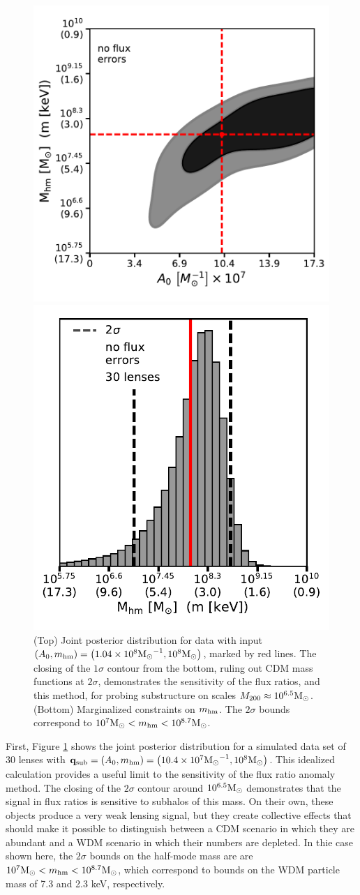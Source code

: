 \begin{figure}
	\centerline{
		\includegraphics[clip,trim=0cm .5cm 0cm
		0cm,width=.48\textwidth,keepaspectratio]{./figures_ABCforward/joint_30_0025_8_noerrors.pdf}
	}
	\centerline{
		\includegraphics[clip,trim=0cm 0cm 0cm
		0cm,width=.48\textwidth,keepaspectratio]{./figures_ABCforward/marginal_mhm_30lens_0025_8.pdf}
	}
	\caption[Posterior distribution for the half-mode mass inferred from WDM mock datasets]{\label{fig:wdm_inf_noerror}
		(Top) Joint posterior distribution for data with input $\left(A_0,m_{\rm{hm}}\right) = \left(1.04\times 10^8 {\rm{M}_{\odot}}^{-1},10^8 {\rm{M}_{\odot}} \right)$, marked by red lines. The closing of the $1\sigma$ contour from the bottom, ruling out CDM mass functions at $2\sigma$, demonstrates the sensitivity of the flux ratios, and this method, for probing substructure on scales $M_{200} \approx 10^{6.5} {\rm{M}_{\odot}}$.
		(Bottom) Marginalized constraints on $m_{\rm{hm}}$.  The $2 \sigma$ bounds correspond to $10^{7} {\rm{M}_{\odot}} < m_{\rm{hm}} < 10^{8.7} {\rm{M}_{\odot}}$.}
\end{figure}

First, Figure \ref{fig:wdm_inf_noerror} shows the joint posterior distribution for a simulated data set of 30 lenses with ${\bf{q}_{\rm{sub}}} = \left(A_0,m_{\rm{hm}}\right) = \left(10.4 \times 10^7 {\rm{M}_{\odot}}^{-1},10^8 {\rm{M}_{\odot}} \right)$. This idealized calculation provides a useful limit to the sensitivity of the flux ratio anomaly method. The closing of the $2\sigma$ contour around $10^{6.5} {\rm{M}_{\odot}}$ demonstrates that the signal in flux ratios is sensitive to subhalos of this mass. On their own, these objects produce a very weak lensing signal, but they create collective effects that should make it possible to distinguish between a CDM scenario in which they are abundant and a WDM scenario in which their numbers are depleted.  In thie case shown here, the $2 \sigma$ bounds on the half-mode mass are are $10^{7} {\rm{M}_{\odot}} < m_{\rm{hm}} < 10^{8.7} {\rm{M}_{\odot}}$, which correspond to bounds on the WDM particle mass of 7.3 and 2.3 keV, respectively. 


